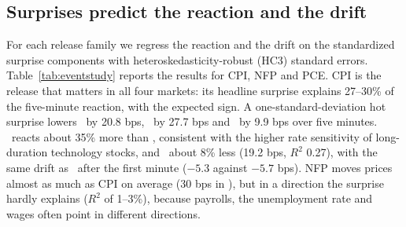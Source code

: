 \subsection{Surprises predict the reaction and the drift}

For each release family we regress the reaction and the drift on the standardized surprise
components with heteroskedasticity-robust (HC3) standard errors. Table~\ref{tab:eventstudy}
reports the results for CPI, NFP and PCE. CPI is the release that matters in all four markets: its
headline surprise explains 27--30\% of the five-minute reaction, with the expected sign. A
one-standard-deviation hot surprise lowers \ES\ by 20.8 bps, \NQ\ by 27.7 bps and \ZN\ by 9.9 bps
over five minutes. \NQ\ reacts about 35\% more than \ES, consistent with the higher rate
sensitivity of long-duration technology stocks, and \YM\ about 8\% less (19.2 bps, $R^2$ 0.27), with
the same drift as \ES\ after the first minute ($-5.3$ against $-5.7$ bps). NFP moves prices almost as much as CPI on average
(30 bps in \ES), but in a direction the surprise hardly explains ($R^2$ of 1--3\%), because
payrolls, the unemployment rate and wages often point in different directions.


